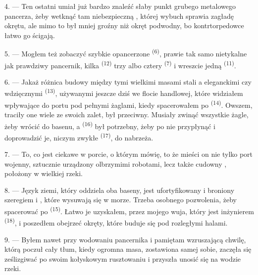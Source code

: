 \VUsaut{3.0mm}
\VUsaut{3.0mm}

4. --- Ten ostatni umiał już bardzo  znaleźć słaby punkt grubego
metalowego pancerza, żeby wetknąć tam niebezpieczną , której wybuch
sprawia zagładę okrętu, ale mimo to był mniej groźny niż okręt podwodny, bo
kontrtorpedowce łatwo go ścigają.

5. --- Mogłem też zobaczyć szybkie opancerzone  \textsuperscript{(6)},
prawie tak samo nietykalne jak prawdziwy pancernik, kilka 
\textsuperscript{(12)} trzy albo cztery  \textsuperscript{(7)} i
wreszcie jedną  \textsuperscript{(11)}. 

6. --- Jakaż różnica budowy między tymi wielkimi masami stali a eleganckimi
 czy wdzięcznymi  \textsuperscript{(13)},
używanymi jeszcze dziś we flocie handlowej, które widziałem wpływające do portu pod
pełnymi żaglami, kiedy spacerowałem po  \textsuperscript{(14)}. Owszem,
traciły one wiele ze swoich zalet,   był przeciwny. Musiały
zwinąć wszystkie żagle, żeby wrócić do basenu, a 
\textsuperscript{(16)} był potrzebny, żeby po nie przypłynąć i doprowadzić je, niczym
zwykłe  \textsuperscript{(17)}, do nabrzeża.

\VUsaut{3.0mm}
\VUsaut{3.0mm}

7. --- To, co jest ciekawe w porcie, o którym mówię, to że mieści on nie tylko port
wojenny, sztucznie urządzony olbrzymimi robotami, lecz także cudowny , położony w  wielkiej rzeki.

8. --- Język ziemi, który oddziela oba baseny, jest ufortyfikowany i broniony szeregiem
 i , które wysuwają się w morze. Trzeba osobnego
pozwolenia, żeby spacerować po  \textsuperscript{(15)}. Łatwo je
uzyskałem, przez mojego wuja, który jest inżynierem 
\textsuperscript{(18)}, i poszedłem obejrzeć okręty, które buduje się pod rozległymi
halami.

9. --- Byłem nawet przy wodowaniu pancernika i pamiętam wzruszającą chwilę, którą
poczuł cały tłum, kiedy ogromna masa, zostawiona samej sobie, zaczęła się ześlizgiwać po
swoim kołyskowym rusztowaniu i przyszła unosić się na wodzie rzeki.

